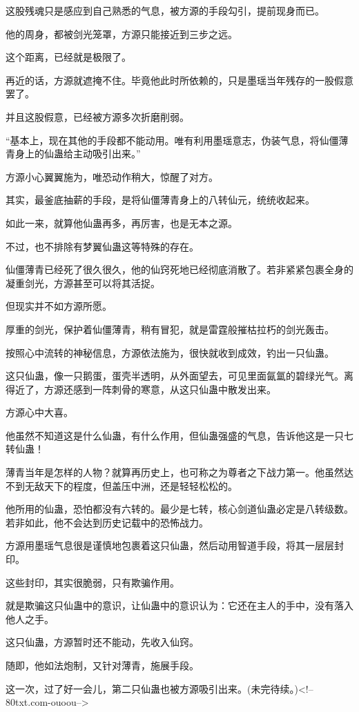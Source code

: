 \begin{this_body}
这股残魂只是感应到自己熟悉的气息，被方源的手段勾引，提前现身而已。

他的周身，都被剑光笼罩，方源只能接近到三步之远。

这个距离，已经就是极限了。

再近的话，方源就遮掩不住。毕竟他此时所依赖的，只是墨瑶当年残存的一股假意罢了。

并且这股假意，已经被方源多次折磨削弱。

“基本上，现在其他的手段都不能动用。唯有利用墨瑶意志，伪装气息，将仙僵薄青身上的仙蛊给主动吸引出来。”

方源小心翼翼施为，唯恐动作稍大，惊醒了对方。

其实，最釜底抽薪的手段，是将仙僵薄青身上的八转仙元，统统收起来。

如此一来，就算他仙蛊再多，再厉害，也是无本之源。

不过，也不排除有梦翼仙蛊这等特殊的存在。

仙僵薄青已经死了很久很久，他的仙窍死地已经彻底消散了。若非紧紧包裹全身的凝重剑光，方源甚至可以将其活捉。

但现实并不如方源所愿。

厚重的剑光，保护着仙僵薄青，稍有冒犯，就是雷霆般摧枯拉朽的剑光轰击。

按照心中流转的神秘信息，方源依法施为，很快就收到成效，钓出一只仙蛊。

这只仙蛊，像一只鹅蛋，蛋壳半透明，从外面望去，可见里面氤氲的碧绿光气。离得近了，方源还感到一阵刺骨的寒意，从这只仙蛊中散发出来。

方源心中大喜。

他虽然不知道这是什么仙蛊，有什么作用，但仙蛊强盛的气息，告诉他这是一只七转仙蛊！

薄青当年是怎样的人物？就算再历史上，也可称之为尊者之下战力第一。他虽然达不到无敌天下的程度，但盖压中洲，还是轻轻松松的。

他所用的仙蛊，恐怕都没有六转的。最少是七转，核心剑道仙蛊必定是八转级数。若非如此，他不会达到历史记载中的恐怖战力。

方源用墨瑶气息很是谨慎地包裹着这只仙蛊，然后动用智道手段，将其一层层封印。

这些封印，其实很脆弱，只有欺骗作用。

就是欺骗这只仙蛊中的意识，让仙蛊中的意识认为：它还在主人的手中，没有落入他人之手。

这只仙蛊，方源暂时还不能动，先收入仙窍。

随即，他如法炮制，又针对薄青，施展手段。

这一次，过了好一会儿，第二只仙蛊也被方源吸引出来。(未完待续。)<!--80txt.com-ouoou-->

\end{this_body}

